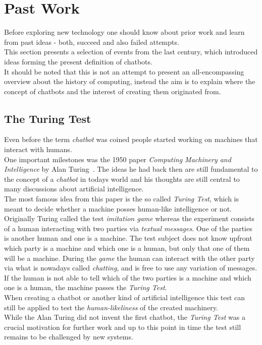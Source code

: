 \section{Past Work}


Before exploring new technology one should know about prior work and learn from past ideas - both, succeed and also failed attempts.
\\
This section presents a selection of events from the last century, which introduced ideas forming the present definition of chatbots.
\\
It should be noted that this is not an attempt to present an all-encompassing overview about the history of computing,
instead the aim is to explain where the concept of chatbots and the interest of creating them originated from.


\subsection{The Turing Test}

Even before the term \emph{chatbot} was coined people started working on machines that interact with humans.
\\
One important milestones was the 1950 paper \emph{Computing Machinery and Intelligence} by Alan Turing~\cite{turing}.
The ideas he had back then are still fundamental to the concept of a \emph{chatbot} in todays world
and his thoughts are still central to many discussions about artificial intelligence.
\\
The most famous idea from this paper is the so called \emph{Turing Test},
which is meant to decide whether a machine posses human-like intelligence or not.
\\
Originally Turing called the test \emph{imitation game} whereas the experiment consists of a human interacting with two parties via \emph{textual messages}.
One of the parties is another human and one is a machine.
The test subject does not know upfront which party is a machine and which one is a human, but only that one of them will be a machine.
During the \emph{game} the human can interact with the other party
via what is nowadays called \emph{chatting},
and is free to use any variation of messages.
\\
If the human is not able to tell which of the two parties is a machine and which one is a human, the machine passes the \emph{Turing Test}.
\\

When creating a chatbot or another kind of artificial intelligence this test can still be applied to test the \emph{human-likeliness} of the created machinery.
\\
While the Alan Turing did not invent the first chatbot, the \emph{Turing Test} was a crucial motivation for further work
and up to this point in time the test still remains to be challenged by new systems.


